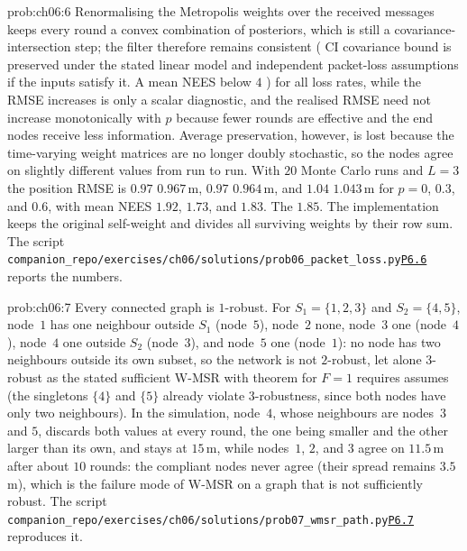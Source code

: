 \documentclass[graybox,envcountchap]{style/SNmono}
\newcommand{\repopath}[1]{\texttt{#1}}
\providecommand{\DIFadd}[1]{{\protect\color{blue} #1}} %
\providecommand{\DIFdel}[1]{{\protect\color{red} #1}} %
\providecommand{\DIFaddbegin}{} %
\providecommand{\DIFaddend}{} %
\providecommand{\DIFdelbegin}{} %
\providecommand{\DIFdelend}{} %
\DeclareRobustCommand{\RtwoDel}[1]{{\color{red}%
  \renewcommand{\DIFadd}[1]{##1}\renewcommand{\DIFdel}[1]{##1}%
  #1}}
\DeclareRobustCommand{\RtwoAdd}[1]{{\color{blue}#1}}
\DeclareRobustCommand{\codeentry}[1]{\hyperref[code:#1]{\texttt{#1}}}
\begin{document}
\begin{sol}{prob:ch06:6}
Renormalising the Metropolis weights over the received messages keeps every round a convex combination of posteriors, which is still a covariance-intersection step; the \DIFdelbegin \DIFdel{filter therefore remains consistent (}\DIFdelend \DIFaddbegin \DIFadd{CI covariance bound is preserved under the stated linear model and independent packet-loss assumptions if the inputs satisfy it. A }\DIFaddend mean NEES below $4$ \DIFdelbegin \DIFdel{) for all loss rates, while the RMSE increases }\DIFdelend \DIFaddbegin \DIFadd{is only a scalar diagnostic, and the realised RMSE need not increase monotonically }\DIFaddend with $p$ because fewer rounds are effective and the end nodes receive less information. Average preservation, however, is lost because the time-varying weight matrices are no longer doubly stochastic, so the nodes agree on slightly different values from run to run. With $20$ Monte Carlo runs and $L=3$ the position RMSE is \DIFdelbegin \DIFdel{$0.97$}\DIFdelend \DIFaddbegin \DIFadd{$0.967$}\DIFaddend \,m, \DIFdelbegin \DIFdel{$0.97$}\DIFdelend \DIFaddbegin \DIFadd{$0.964$}\DIFaddend \,m, and \DIFdelbegin \DIFdel{$1.04$}\DIFdelend \DIFaddbegin \DIFadd{$1.043$}\DIFaddend \,m for $p=0$, $0.3$, and $0.6$, with mean NEES $1.92$, $1.73$, and \DIFdelbegin \DIFdel{$1.83$. The }\DIFdelend \DIFaddbegin \DIFadd{$1.85$. The implementation keeps the original self-weight and divides all surviving weights by their row sum. The }\DIFaddend script \RtwoDel{\repopath{companion\_\allowbreak repo/\allowbreak exercises/\allowbreak ch06/\allowbreak solutions/\allowbreak prob06\_\allowbreak packet\_\allowbreak loss.py}}\RtwoAdd{\codeentry{P6.6}} reports the numbers.
\end{sol}

\begin{sol}{prob:ch06:7}
Every connected graph is $1$-robust. For $S_1=\{1,2,3\}$ and $S_2=\{4,5\}$, node~$1$ has one neighbour outside $S_1$ (node~$5$), node~$2$ none, node~$3$ one (node~$4$), node~$4$ one outside $S_2$ (node~$3$), and node~$5$ one (node~$1$): no node has two neighbours outside its own subset, so the network is not $2$-robust, let alone $3$-robust as \DIFaddbegin \DIFadd{the stated sufficient }\DIFaddend W-MSR \DIFdelbegin \DIFdel{with }\DIFdelend \DIFaddbegin \DIFadd{theorem for }\DIFaddend $F=1$ \DIFdelbegin \DIFdel{requires }\DIFdelend \DIFaddbegin \DIFadd{assumes }\DIFaddend (the singletons $\{4\}$ and $\{5\}$ already violate $3$-robustness, since both nodes have only two neighbours). In the simulation, node~$4$, whose neighbours are nodes~$3$ and $5$, discards both values at every round, the one being smaller and the other larger than its own, and stays at $15$\,m, while nodes~$1$, $2$, and $3$ agree on $11.5$\,m after about $10$ rounds: the compliant nodes never agree (their spread remains $3.5$\,m), which is the failure mode of W-MSR on a graph that is not sufficiently robust. The script \RtwoDel{\repopath{companion\_\allowbreak repo/\allowbreak exercises/\allowbreak ch06/\allowbreak solutions/\allowbreak prob07\_\allowbreak wmsr\_\allowbreak path.py}}\RtwoAdd{\codeentry{P6.7}} reproduces it.
\end{sol}
\end{document}
